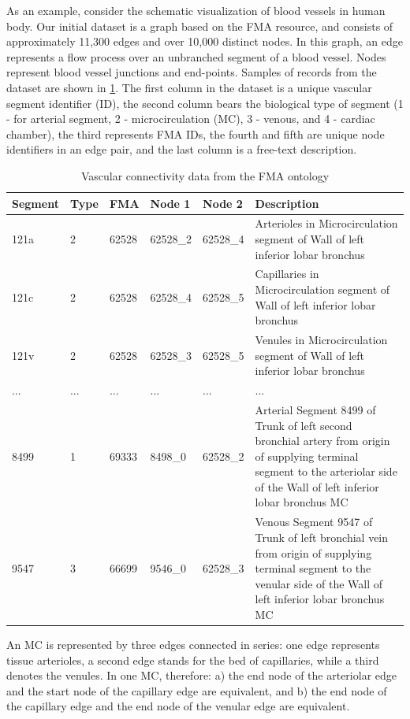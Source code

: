 As an example, consider the schematic visualization of blood vessels in human body. Our initial dataset is a graph based on the FMA resource, and consists of approximately 11,300 edges and over 10,000 distinct nodes. In this graph, an edge represents a flow process over an unbranched segment of a blood vessel. Nodes represent blood vessel junctions and end-points. Samples of records from the dataset are shown in \cref{tab:vascular-connectivity}. The first column in the dataset is a unique vascular segment identifier (ID), the second column bears the biological type of segment (1 - for arterial segment, 2 - microcirculation (MC), 3 - venous, and 4 - cardiac chamber), the third represents FMA IDs, the fourth and fifth are unique node identifiers in an edge pair, and the last column is a free-text description.

\begin{table}
\caption{Vascular connectivity data from the FMA ontology}
\begin{tabular}{|l|l|l|l|l|p{7cm}|}
  \hline
  Segment & Type & FMA & Node 1 & Node 2 & Description \\
  \hline
  121a & 2 & 62528 & 62528\_2 & 62528\_4 & Arterioles in Microcirculation segment of Wall of left inferior lobar bronchus \\
  121c & 2 & 62528 & 62528\_4 & 62528\_5 & Capillaries in Microcirculation segment of Wall of left inferior lobar bronchus\\
  121v & 2 & 62528 & 62528\_3 & 62528\_5 & Venules in Microcirculation segment of Wall of left inferior lobar bronchus\\
  ... &... & ...   & ...      & ...      & ...\\
  8499 & 1 & 69333 & 8498\_0 & 62528\_2  & Arterial Segment 8499 of Trunk
of left second bronchial artery from origin of supplying terminal segment
to the arteriolar side of the Wall of left inferior lobar bronchus
MC\\
  9547 & 3 & 66699 & 9546\_0 & 62528\_3 & Venous Segment 9547 of Trunk of
left bronchial vein from origin of supplying terminal segment to the
venular side of the Wall of left inferior lobar bronchus MC \\
  \hline
\end{tabular}
\label{tab:vascular-connectivity}
\end{table}

An MC is represented by three edges connected in series: one edge represents tissue arterioles, a second edge stands for the bed of
capillaries, while a third denotes the venules. In one MC, therefore: a) the end node of the arteriolar edge and the start node of the
capillary edge are equivalent, and b) the end node of the capillary edge and the end node of the venular edge are equivalent.

